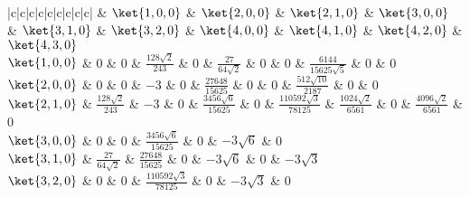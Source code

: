 

\begin{table}[ht]
\centering
\caption{$\mel{\psi_{n',l',m'}}{z}{\psi_{n,l,m}}$}\label{HDipM_tab1}
\begin{tabular}{|c|c|c|c|c|c|c|c|c|}
\hline
& $\ket{1,0,0}$ & $\ket{2,0,0}$ & $\ket{2,1,0}$ & $\ket{3,0,0}$ & $\ket{3,1,0}$ & $\ket{3,2,0}$ & $\ket{4,0,0}$ &  $\ket{4,1,0}$ & $\ket{4,2,0}$ & $\ket{4,3,0}$ \\
\hline
$\ket{1,0,0}$ & 0 & 0 & $\frac{128\sqrt 2}{243}$ & 0 & $\frac{27}{64\sqrt 2}$ & 0 & 0 & $\frac{6144}{15625 \sqrt 5}$ & 0 & 0\\
\hline
$\ket{2,0,0}$ & 0 & 0 & $-3$ & 0 & $\frac{27648}{15625}$ & 0 & 0 & $\frac{512\sqrt{10}}{2187}$ & 0 & 0 \\
\hline
$\ket{2,1,0}$ & $\frac{128\sqrt 2}{243}$ & $-3$ & 0 & $\frac{3456\sqrt 6}{15625}$ & 0 & $\frac{110592\sqrt 3}{78125}$ & $\frac{1024\sqrt 2}{6561}$ & 0 & $\frac{4096\sqrt 2}{6561}$ & 0\\
\hline
$\ket{3,0,0}$ & 0 & 0 & $\frac{3456\sqrt 6}{15625}$ & 0 & $-3\sqrt 6$ & 0 \\
\hline
$\ket{3,1,0}$ & $\frac{27}{64\sqrt 2}$ & $\frac{27648}{15625}$ & 0 & $-3\sqrt 6$ & 0 & $-3 \sqrt 3$ \\
\hline
$\ket{3,2,0}$ & 0 & 0 & $\frac{110592\sqrt 3}{78125}$ & 0 & $-3\sqrt 3$ & 0 \\
\hline
\end{tabular}
\end{table}
